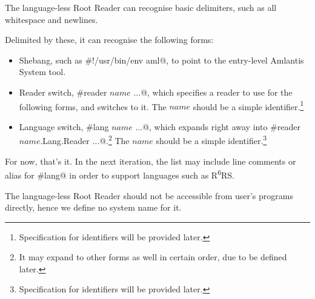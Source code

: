 The language-less Root Reader can recognise basic delimiters, such as all whitespace and newlines. 

Delimited by these, it can recognise the following forms:

\begin{itemize}
  \item Shebang, such as \lstinline@#!/usr/bin/env aml@, to point to the entry-level Amlantis System tool.
  \item Reader switch, \lstinline@#reader $name$ $\ldots$@, which specifies a reader to use for the following forms, and switches to it. The $name$ should be a simple identifier.\footnote{Specification for identifiers will be provided later.}
  \item Language switch, \lstinline@#lang $name$ $\ldots$@, which expands right away into \lstinline@#reader $name$.Lang.Reader $\ldots$@.\footnote{It may expand to other forms as well in certain order, due to be defined later.} The $name$ should be a simple identifier.\footnote{Specification for identifiers will be provided later.}
\end{itemize}


For now, that's it. In the next iteration, the list may include line comments or alias for \lstinline@#lang@ in order to support languages such as R\textsuperscript{6}RS.

The language-less Root Reader should not be accessible from user's programs directly, hence we define no system name for it.




